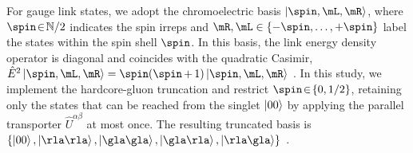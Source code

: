 \documentclass[aps,prl,reprint,twocolumn,superscriptaddress,floatfix,nofootinbib]{revtex4-2}
\begin{document}
For gauge link states, we adopt the chromoelectric basis $\ket{\spin, \mL, \mR}$, where $\spin\!\in\!\mathbb{N}/2$ indicates the spin irreps and $\mR,\mL\in\{-\spin,\ldots,+\spin\}$ label the states within the spin shell $\spin$.
In this basis, the link energy density operator is diagonal and coincides with the quadratic Casimir, $\hat{E}^2\ket{\spin, \mL, \mR}=\spin(\spin\mathop+1)\ket{\spin, \mL, \mR}$ \cite{Zohar2015FormulationLatticeGauge}.
In this study, we implement the hardcore-gluon truncation and restrict $\spin \!\in\!\qty{0,1/2}$, retaining only the states that can be reached from the singlet $\ket{00}$ by applying the parallel transporter $\hat{U}^{\alpha\beta}$ at most once.
The resulting truncated basis is
\begin{math}
    \qty{\ket{00},\ket{\rla\rla},\ket{\gla\gla},\ket{\gla\rla},\ket{\rla\gla}}
\end{math}
\cite{Cataldi2024Simulating2+1DSU2, Calajo2024DigitalQuantumSimulation, Calajo2025QuantumManybodyScarring}.
\end{document}
